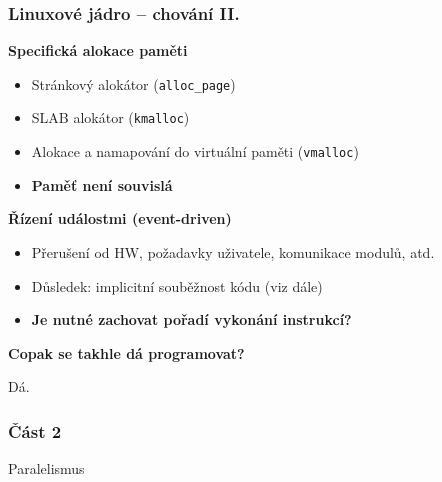 \documentclass[xcolor=dvipsnames]{beamer}
\newcommand{\heading}[1]{\textbf{\textcolor{BurntOrange}{#1}}}
\begin{document}
\begin{frame}
  \frametitle{Linuxové jádro -- chování II.}
  \heading{Specifická alokace paměti}
  \begin{itemize}
  \item Stránkový alokátor (\texttt{alloc\_page})
  \item SLAB alokátor (\texttt{kmalloc})
  \item Alokace a namapování do virtuální paměti (\texttt{vmalloc})
  \item \textbf{Paměť není souvislá}
  \end{itemize}

  \pause
  \medskip

  \heading{Řízení událostmi (event-driven)}
  \begin{itemize}
  \item Přerušení od HW, požadavky uživatele, komunikace modulů, atd.
  \item Důsledek: implicitní souběžnost kódu (viz dále)
  \item \textbf{Je nutné zachovat pořadí vykonání instrukcí?}
  \end{itemize}

  \pause
  \medskip

  \begin{center}
  \heading{Copak se takhle dá programovat?}

  \pause
  \smallskip

  Dá.
  \end{center}

\end{frame}


\begin{frame}
  \frametitle{Část 2}
  \begin{center}
  {\huge Paralelismus}
  \end{center}
\end{frame}
\end{document}

